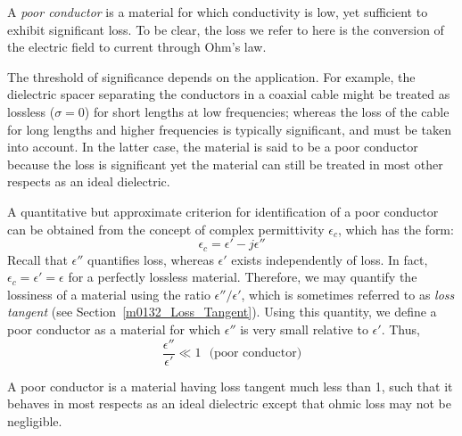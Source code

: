 

\label{m0156_Poor_Conductors} %

A \emph{poor conductor} is a material for which conductivity is low, yet sufficient to exhibit significant loss.
To be clear, the loss we refer to here is the conversion of the electric field to current through Ohm's law.

The threshold of significance depends on the application. 
For example, the dielectric spacer separating the conductors in a coaxial cable might be treated as lossless ($\sigma=0$) for short lengths at low frequencies; whereas the loss of the cable for long lengths and higher frequencies is typically significant, and must be taken into account.
In the latter case, the material is said to be a poor conductor because the loss is significant yet the material can still be treated in most other respects as an ideal dielectric.

A quantitative but approximate criterion for identification of a poor conductor can be obtained from the concept of complex permittivity $\epsilon_c$, which has the form:
%
\begin{equation}
\epsilon_c = \epsilon' - j\epsilon''
\end{equation}
%
Recall that $\epsilon''$ quantifies loss, whereas $\epsilon'$ exists independently of loss.
In fact, $\epsilon_c=\epsilon'=\epsilon$ for a perfectly lossless material.
Therefore, we may quantify the lossiness of a material using the ratio $\epsilon''/\epsilon'$, which is sometimes referred to as \emph{loss tangent}
(see Section~\ref{m0132_Loss_Tangent}).
Using this quantity, we define a poor conductor as a material for which $\epsilon''$ is very small relative to $\epsilon'$.
Thus,
%
\begin{equation}
\frac{\epsilon''}{\epsilon'} \ll 1 ~~~ \mbox{(poor conductor)}
\label{m0156_eDef}
\end{equation}
%
\begin{mdframed}[backgroundcolor=yellow!20,nobreak=true] 
A poor conductor is a material having loss tangent much less than 1, such that it behaves in most respects as an ideal dielectric except that ohmic loss may not be negligible. 
\end{mdframed}


